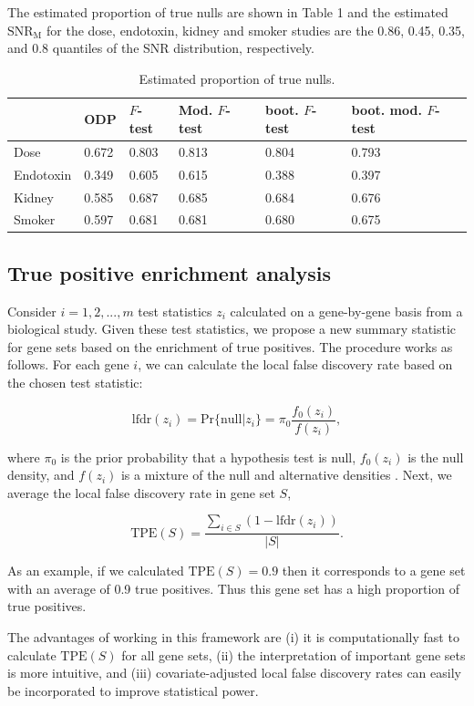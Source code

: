 \documentclass[11pt]{article}
\begin{document}
The estimated proportion of true nulls are shown in Table 1 and the estimated $\text{SNR}_{\text{M}}$ for the dose, endotoxin, kidney and smoker studies are the 0.86, 0.45, 0.35, and 0.8 quantiles of the SNR distribution, respectively. 

\begin{table}
\centering
\begin{tabular}{|l|l|l|l|l|l|}
\hline
          & ODP   & $F$-test & Mod. $F$-test  & boot. $F$-test & boot. mod. $F$-test \\ \hline
Dose      & 0.672 & 0.803 & 0.813 & 0.804         & 0.793         \\ \hline
Endotoxin & 0.349 & 0.605 & 0.615 & 0.388         & 0.397          \\ \hline
Kidney    & 0.585 & 0.687 & 0.685 & 0.684         & 0.676          \\ \hline
Smoker    & 0.597 & 0.681 & 0.681 & 0.680         & 0.675          \\ \hline
\end{tabular}
\caption{Estimated proportion of true nulls.}
\label{tab:pi0}
\end{table}

\subsection{True positive enrichment analysis\label{Subsec:tpea}}

Consider $i=1,2,...,m$ test statistics $z_{i}$ calculated on a gene-by-gene basis from a biological study. Given these test statistics, we propose a new summary statistic for gene sets based on the enrichment of true positives. The procedure works as follows. For each gene $i$, we can calculate the local false discovery rate based on the chosen test statistic:

$$
\text{lfdr}(z_{i}) = \text{Pr}\{\text{null}|z_{i}\} = \pi_{0} \dfrac{f_{0}(z_{i})}{f(z_{i})},
$$

\noindent where $\pi_{0}$ is the prior probability that a hypothesis test is null, $f_{0}(z_{i})$ is the null density, and $f(z_{i})$ is a mixture of the null and alternative densities \citep{efron2001empirical}. Next, we average the local false discovery rate in gene set $S$, 

$$
\text{TPE}(S) = \frac{\sum\limits_{i\in S} (1-\text{lfdr}(z_{i}))}{|S|}.
$$

\noindent As an example, if we calculated $\text{TPE}(S)=0.9$ then it corresponds to a gene set with an average of 0.9 true positives. Thus this gene set has a high proportion of true positives.

The advantages of working in this framework are (i) it is computationally fast to calculate $\text{TPE}(S)$ for all gene sets, (ii) the interpretation of important gene sets is more intuitive, and (iii) covariate-adjusted local false discovery rates can easily be incorporated to improve statistical power.

\clearpage


\end{document}
